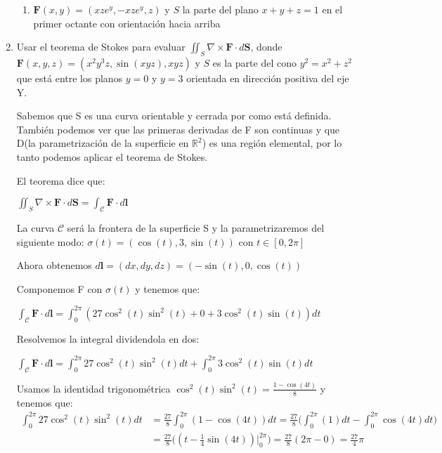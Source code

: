 \documentclass{article}
\begin{document}
\begin{enumerate}
{\begin{enumerate}
{			\color{azul}


            }

            \item{
            	$\mathbf{F} (x,y) = (xze^y,-xze^y,z)$ y $S$ la parte del plano $x + y+ z = 1$ en el primer octante con orientación hacia arriba

           \color{azul}

            }
            \end{enumerate}


        }

        \item {
            Usar el teorema de Stokes para evaluar $\iint_{S} \nabla \times \mathbf{F} \cdot d\mathbf{S}$, donde $\mathbf{F}(x,y,z) =(x^2y^3z,\sin(xyz),xyz)$ y $S$ es la parte del cono $y^2 = x^2 + z^2$ que está entre los planos $y = 0$ y $y = 3$ orientada en dirección positiva del eje Y.

            \color{azul}
            Sabemos que S es una curva orientable y cerrada por como está definida. También podemos ver que las primeras derivadas de F son continuas y que D(la parametrización de la superficie en $\mathbb{R}^2$) es una región elemental, por lo tanto podemos aplicar el teorema de Stokes.
            
            El teorema dice que:
            
            $\iint_{S} \nabla \times \mathbf{F} \cdot d\mathbf{S} = \int_{\mathcal{C}} \mathbf{F} \cdot d\mathbf{l}$
            
            La curva $\mathcal{C}$ será la frontera de la superficie S y la parametrizaremos del siguiente modo: $\sigma(t) = (\cos(t), 3, \sin(t))$ con $t \in [0, 2\pi]$
            
            Ahora obtenemos $d\mathbf{l} = (dx, dy, dz) = (-\sin(t), 0, \cos(t))$
            
        Componemos F con $\sigma(t)$ y tenemos que:
        
        $\int_{\mathcal{C}} \mathbf{F} \cdot d\mathbf{l} = \int_{0}^{2\pi} (27\cos^2(t)\sin^2(t) + 0 + 3\cos^2(t)\sin(t)) dt$
        
        Resolvemos la integral dividendola en dos:
        
         $\int_{\mathcal{C}} \mathbf{F} \cdot d\mathbf{l} = \int_{0}^{2\pi} 27\cos^2(t)\sin^2(t) dt +   \int_{0}^{2\pi}3\cos^2(t)\sin(t)dt$
         
         Usamos la identidad trigonométrica $\cos^2(t)\sin^2(t) = \frac{1 - \cos(4t)}{8}$ y tenemos que:
         \begin{align*}
                \int_{0}^{2\pi}{27\cos^2(t)\sin^2(t)dt}
                &= \frac{27}{8} \int_{0}^{2\pi}{(1 - \cos(4t)) dt}
                = \frac{27}{8} \Big(\int_{0}^{2\pi}{(1)dt }  - \int_{0}^{2\pi}{\cos(4t)dt}\Big)\\[0.3cm]
                &= \frac{27}{8}\Big((t - \frac{1}{4} \sin(4t))\Big |_{0}^{2\pi}\Big)
                = \frac{27}{8} (2\pi - 0)
               	= \frac{27}{4}\pi
            \end{align*}
         
}
\end{enumerate}
\end{document}

